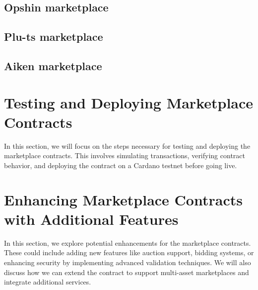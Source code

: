 \subsection{Opshin marketplace}
\subsection{Plu-ts marketplace}
\subsection{Aiken marketplace}



\section{Testing and Deploying Marketplace Contracts}

In this section, we will focus on the steps necessary for testing and deploying the marketplace contracts. This involves simulating transactions, verifying contract behavior, and deploying the contract on a Cardano testnet before going live.

\section{Enhancing Marketplace Contracts with Additional Features}

In this section, we explore potential enhancements for the marketplace contracts. These could include adding new features like auction support, bidding systems, or enhancing security by implementing advanced validation techniques. We will also discuss how we can extend the contract to support multi-asset marketplaces and integrate additional services.
